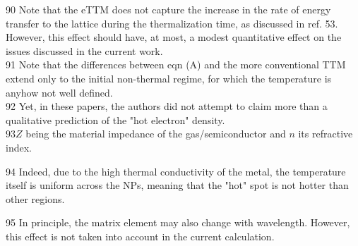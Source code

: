\documentclass[10pt]{article}
\begin{document}
90 Note that the eTTM does not capture the increase in the rate of energy transfer to the lattice during the thermalization time, as discussed in ref. 53. However, this effect should have, at most, a modest quantitative effect on the issues discussed in the current work.\\
91 Note that the differences between eqn (A) and the more conventional TTM extend only to the initial non-thermal regime, for which the temperature is anyhow not well defined.\\
92 Yet, in these papers, the authors did not attempt to claim more than a qualitative prediction of the "hot electron" density.\\
$93 Z$ being the material impedance of the gas/semiconductor and $n$ its refractive index.

94 Indeed, due to the high thermal conductivity of the metal, the temperature itself is uniform across the NPs, meaning that the "hot" spot is not hotter than other regions.

95 In principle, the matrix element may also change with wavelength. However, this effect is not taken into account in the current calculation.
\end{document}
